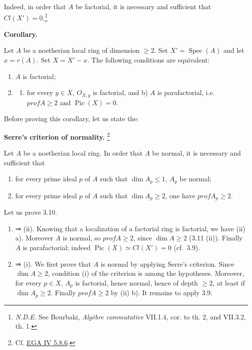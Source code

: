 \documentclass[
  11pt,
  a4paper,
]{book}
\providecommand{\tightlist}{%
  \setlength{\itemsep}{0pt}\setlength{\parskip}{0pt}}
\begin{document}
Indeed, in order that \(A\) be factorial, it is necessary and sufficient
that \(Cl(X') = 0\).\footnote{\emph{N.D.E.} See Bourbaki, \emph{Algèbre
  commutative} VII.1.4, cor. to th. 2, and VII.3.2, th. 1.}

\textbf{Corollary.}

Let \(A\) be a noetherian local ring of dimension \(\geqslant 2\). Set
\(X' = \operatorname{Spec}(A)\) and let \(x = r(A)\). Set
\(X = X' - {x}\). The following conditions are equivalent:

\begin{enumerate}
\def\labelenumi{\arabic{enumi}.}
\tightlist
\item
  \(A\) is factorial;
\item
  \begin{enumerate}
  \def\labelenumii{\alph{enumii})}
  \tightlist
  \item
    for every \(y \in X\), \(O_{X,y}\) is factorial, and b) \(A\) is
    parafactorial, i.e.~\(prof A \geqslant 2\) and
    \(\operatorname{Pic}(X) = 0\).
  \end{enumerate}
\end{enumerate}

Before proving this corollary, let us state the:

\textbf{Serre's criterion of normality.} \footnote{Cf.
  \href{https://jcreinhold.github.io/ega/iv/17-ch4-05-dimension-depth-regularity.html\#58-regular-preschemes-and-property-rn-serres-normality-criterion}{EGA
  IV 5.8.6}.}

Let \(A\) be a noetherian local ring. In order that \(A\) be normal, it
is necessary and sufficient that

\begin{enumerate}
\def\labelenumi{\arabic{enumi}.}
\tightlist
\item
  for every prime ideal \(p\) of \(A\) such that
  \(\dim A_{p} \leqslant 1\), \(A_{p}\) be normal;
\item
  for every prime ideal \(p\) of \(A\) such that
  \(\dim A_{p} \geqslant 2\), one have \(prof A_{p} \geqslant 2\).
\end{enumerate}

Let us prove 3.10.

\begin{enumerate}
\def\labelenumi{(\roman{enumi})}
\item
  ⇒ (ii). Knowing that a localization of a factorial ring is factorial,
  we have (ii) a). Moreover \(A\) is normal, so \(prof A \geqslant 2\),
  since \(\dim A \geqslant 2\) (3.11 (ii)). Finally \(A\) is
  parafactorial; indeed \(\operatorname{Pic}(X) \simeq Cl(X') = 0\)
  (cf.~3.9).
\item
  ⇒ (i). We first prove that \(A\) is normal by applying Serre's
  criterion. Since \(\dim A \geqslant 2\), condition (i) of the
  criterion is among the hypotheses. Moreover, for every \(p \in X\),
  \(A_{p}\) is factorial, hence normal, hence of depth \(\geqslant 2\),
  at least if \(\dim A_{p} \geqslant 2\). Finally \(prof A \geqslant 2\)
  by (ii) b). It remains to apply 3.9.
\end{enumerate}
\end{document}
